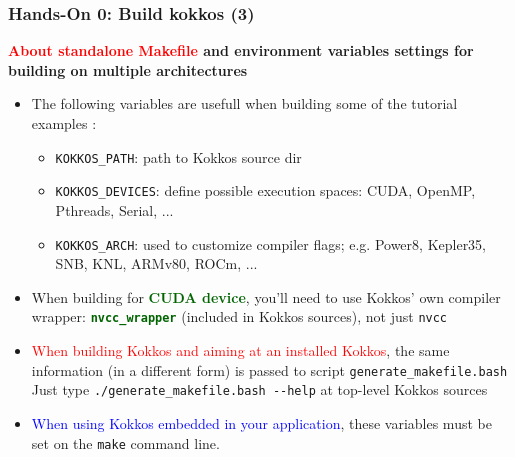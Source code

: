 \begin{frame}
  \frametitle{Hands-On 0: Build kokkos (3)}

  {\bf \textcolor{red}{About standalone Makefile} and environment variables settings for building on multiple architectures}

  \begin{itemize}
  \item The following variables are usefull when building some of the tutorial examples :
    \begin{itemize}
    \item \texttt{KOKKOS\_PATH}: path to Kokkos source dir
    \item \texttt{KOKKOS\_DEVICES}: define possible execution spaces: CUDA, OpenMP, Pthreads, Serial, ...
    \item \texttt{KOKKOS\_ARCH}: used to customize compiler flags; e.g. Power8, Kepler35, SNB, KNL, ARMv80, ROCm, ...
    \end{itemize}
  \item When building for \textcolor{darkgreen}{\bf CUDA device}, you'll need to use Kokkos' own compiler wrapper: \textcolor{darkgreen}{\texttt{\bf nvcc\_wrapper}} (included in Kokkos sources), not just \texttt{nvcc}
  \item \textcolor{red}{When building Kokkos and aiming at an installed Kokkos}, the same information (in a different form) is passed to script \texttt{generate\_makefile.bash}\\
    Just type \texttt{./generate\_makefile.bash \--\--help} at top-level Kokkos sources
  \item \textcolor{blue}{When using Kokkos embedded in your application}, these variables must be set on the \texttt{make} command line.
  \end{itemize}
  
\end{frame}
  
